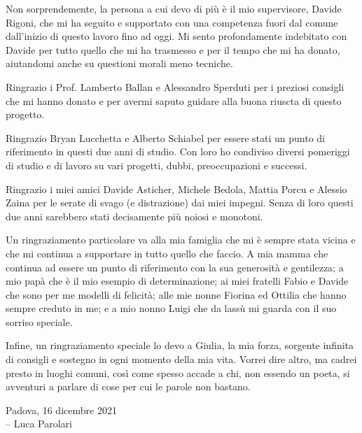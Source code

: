 
Non sorprendemente, la persona a cui devo di più è il mio supervisore,
Davide Rigoni, che mi ha seguito e supportato con una competenza fuori
dal comune dall'inizio di questo lavoro fino ad oggi. Mi sento
profondamente indebitato con Davide per tutto quello che mi ha
trasmesso e per il tempo che mi ha donato, aiutandomi anche su
questioni morali meno tecniche.

\vspace{0.2cm}

Ringrazio i Prof. Lamberto Ballan e Alessandro Sperduti per i preziosi
consigli che mi hanno donato e per avermi saputo guidare alla buona
riuscta di questo progetto.

\vspace{0.2cm}

Ringrazio Bryan Lucchetta e Alberto Schiabel per essere stati un punto
di riferimento in questi due anni di studio. Con loro ho condiviso
diversi pomeriggi di studio e di lavoro su vari progetti, dubbi,
preoccupazioni e successi.

\vspace{0.2cm}

Ringrazio i miei amici Davide Asticher, Michele Bedola, Mattia Porcu e
Alessio Zaina per le serate di svago (e distrazione) dai miei impegni.
Senza di loro questi due anni sarebbero stati decisamente più noiosi e
monotoni.

\vspace{0.2cm}

Un ringraziamento particolare va alla mia famiglia che mi è sempre
stata vicina e che mi continua a supportare in tutto quello che
faccio. A mia mamma che continua ad essere un punto di riferimento con
la sua generosità e gentilezza; a mio papà che è il mio esempio di
determinazione; ai miei fratelli Fabio e Davide che sono per me
modelli di felicità; alle mie nonne Fiorina ed Ottilia che hanno
sempre creduto in me; e a mio nonno Luigi che da lassù mi guarda con
il suo sorriso speciale.

\vspace{0.2cm}

Infine, un ringraziamento speciale lo devo a Giulia, la mia forza,
sorgente infinita di consigli e sostegno in ogni momento della mia
vita. Vorrei dire altro, ma cadrei presto in luoghi comuni, così come
spesso accade a chi, non essendo un poeta, si avventuri a parlare di
cose per cui le parole non bastano.

\vspace{1cm}

\begin{flushright}
  Padova, 16 dicembre 2021 \\
  -- Luca Parolari
\end{flushright}
